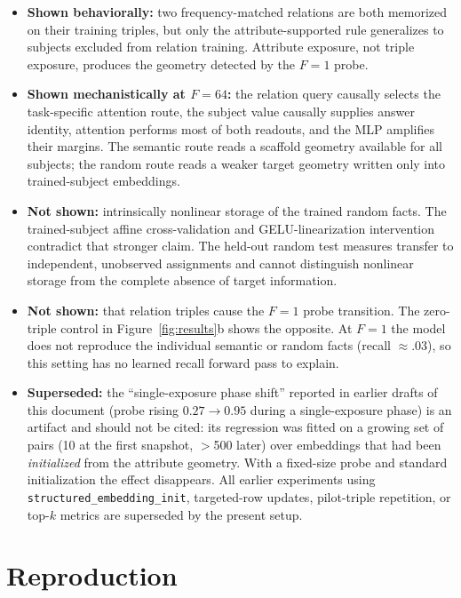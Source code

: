 \documentclass[11pt]{article}
\begin{document}
\begin{itemize}
  \item \textbf{Shown behaviorally:} two frequency-matched relations are both memorized on their training triples, but only the attribute-supported rule generalizes to subjects excluded from relation training. Attribute exposure, not triple exposure, produces the geometry detected by the $F{=}1$ probe.
  \item \textbf{Shown mechanistically at $F{=}64$:} the relation query causally selects the task-specific attention route, the subject value causally supplies answer identity, attention performs most of both readouts, and the MLP amplifies their margins. The semantic route reads a scaffold geometry available for all subjects; the random route reads a weaker target geometry written only into trained-subject embeddings.
  \item \textbf{Not shown:} intrinsically nonlinear storage of the trained random facts. The trained-subject affine cross-validation and GELU-linearization intervention contradict that stronger claim. The held-out random test measures transfer to independent, unobserved assignments and cannot distinguish nonlinear storage from the complete absence of target information.
  \item \textbf{Not shown:} that relation triples cause the $F{=}1$ probe transition. The zero-triple control in Figure~\ref{fig:results}b shows the opposite. At $F{=}1$ the model does not reproduce the individual semantic or random facts (recall $\approx .03$), so this setting has no learned recall forward pass to explain.
  \item \textbf{Superseded:} the ``single-exposure phase shift'' reported in earlier drafts of this document (probe rising $0.27 \rightarrow 0.95$ during a single-exposure phase) is an artifact and should not be cited: its regression was fitted on a growing set of pairs (10 at the first snapshot, $>$500 later) over embeddings that had been \emph{initialized} from the attribute geometry. With a fixed-size probe and standard initialization the effect disappears. All earlier experiments using \texttt{structured\_embedding\_init}, targeted-row updates, pilot-triple repetition, or top-$k$ metrics are superseded by the present setup.
\end{itemize}

\section{Reproduction}
\end{document}
